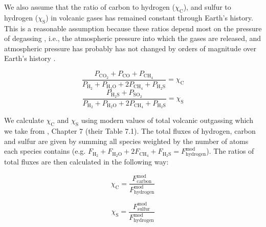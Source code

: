 We also assume that the ratio of carbon to hydrogen ($\chi_\mathrm{C}$), and sulfur to hydrogen ($\chi_\mathrm{S}$) in volcanic gases has remained constant through Earth's history. This is a reasonable assumption because these ratios depend most on the pressure of degassing \citep{Gaillard_2014}, i.e., the atmospheric pressure into which the gases are released, and atmospheric pressure has probably has not changed by orders of magnitude over Earth's history \citep{Som_2012}. 

\begin{equation}
  \frac{P_\mathrm{CO_2} + P_\mathrm{CO} + P_\mathrm{CH_4}}{P_\mathrm{H_2} + P_\mathrm{H_2O} + 2 P_\mathrm{CH_4} + P_\mathrm{H_2S}} = \chi_\mathrm{C}
\end{equation}
\begin{equation}
  \label{eq:chi_sulfur}
  \frac{P_\mathrm{H_2S} + P_\mathrm{SO_2}}{P_\mathrm{H_2} + P_\mathrm{H_2O} + 2 P_\mathrm{CH_4} + P_\mathrm{H_2S}} = \chi_\mathrm{S}
\end{equation}

We calculate $\chi_\mathrm{C}$ and $\chi_\mathrm{S}$ using modern values of total volcanic outgassing which we take from \citet{Catling_2017}, Chapter 7 (their Table 7.1). The total fluxes of hydrogen, carbon and sulfur are given by summing all species weighted by the number of atoms each species contains (e.g. $F_\mathrm{H_2} + F_\mathrm{H_2O} + 2 F_\mathrm{CH_4} + F_\mathrm{H_2S} = F_\mathrm{hydrogen}^\mathrm{mod}$). The ratios of total fluxes are then calculated in the following way: 

\begin{equation}
  \chi_\mathrm{C} = \frac{F_\mathrm{carbon}^\mathrm{mod}}{F_\mathrm{hydrogen}^\mathrm{mod}}
\end{equation}

\begin{equation}
  \chi_\mathrm{S} = \frac{F_\mathrm{sulfur}^\mathrm{mod}}{F_\mathrm{hydrogen}^\mathrm{mod}}
\end{equation}

